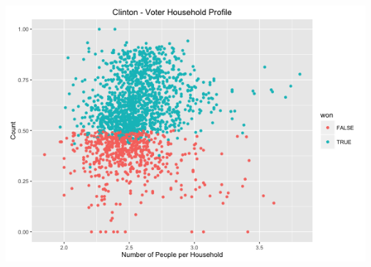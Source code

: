 \documentclass[11pt]{article}
\begin{document}
\includegraphics[scale=0.38]{../exploratory_plots/Clinton_Num_People.png}
\end{document}
